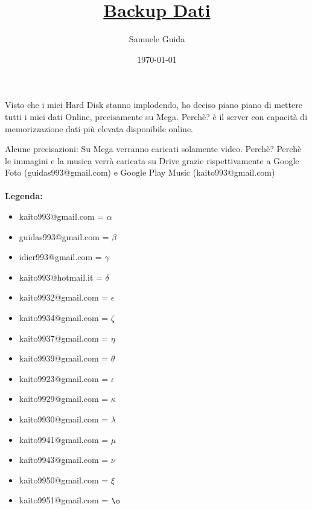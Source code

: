 \documentclass[12pt, a4paper] {article} %
\title{\textbf{\underline{Backup Dati}}}
\author{Samuele Guida}
\date{\today}
\begin{document}
	\maketitle
	Visto che i miei Hard Disk stanno implodendo, ho deciso piano piano di mettere tutti i miei dati Online, precisamente su Mega. Perchè? è il server con capacità di memorizzazione dati più elevata disponibile online.
	
	Alcune precisazioni:
	Su Mega verranno caricati solamente video. Perchè? Perchè le immagini e la musica verrà caricata su Drive grazie rispettivamente a Google Foto (guidas993@gmail.com) e Google Play Music (kaito993@gmail.com)
	\\\\
	\textbf{Legenda:}
	\\
	\begin{itemize}
		\item kaito993@gmail.com = $\alpha$ \\
		\item guidas993@gmail.com = $\beta$ \\
		\item idier993@gmail.com = $\gamma$ \\
		\item kaito993@hotmail.it = $\delta$ \\
		\item kaito9932@gmail.com = $\epsilon$ \\
		\item kaito9934@gmail.com = $\zeta$ \\
		\item kaito9937@gmail.com = $\eta$ \\
		\item kaito9939@gmail.com = $\theta$ \\	
		\item kaito9923@gmail.com = $\iota$ \\
		\item kaito9929@gmail.com = $\kappa$ \\
		\item kaito9930@gmail.com = $\lambda$ \\
		\item kaito9941@gmail.com = $\mu$ \\
		\item kaito9943@gmail.com = $\nu$ \\
		\item kaito9950@gmail.com = $\xi$ \\
		\item kaito9951@gmail.com = $\o$ \\

\end{itemize}
\end{document}
